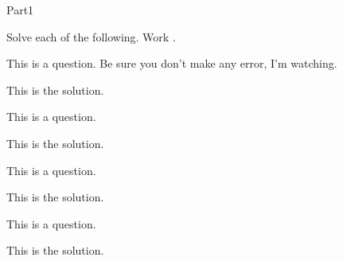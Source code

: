\documentclass{article}
\begin{document}
\begin{exam}[Part I.]{Part1}



\begin{problem*}[12]
Solve each of the following. Work \OnBackOfPage.
\begin{multicols}{2}

\def\solnsp{1in}

\begin{parts}
\item This is a question.  Be sure you don't make any error, I'm watching.

\begin{solution}[\solnsp]
This is the solution.
\end{solution}

\item This is a question.
\begin{solution}[\solnsp]
This is the solution.
\end{solution}

\item This is a question.
\begin{solution}[\solnsp]
This is the solution.
\end{solution}

\item This is a question.
\begin{solution}[\solnsp]
This is the solution.
\end{solution}
\end{parts}
\end{multicols}
\end{problem*}

\end{exam}
\end{document}
